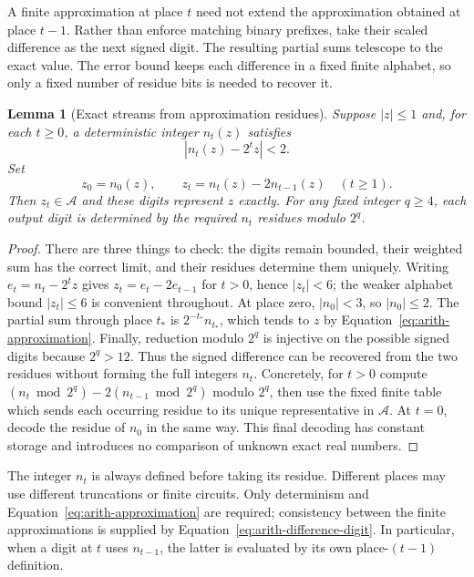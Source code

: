 \documentclass[11pt]{article}
\numberwithin{equation}{section}
\newtheorem{lemma}[theorem]{Lemma}
\theoremstyle{definition}
\theoremstyle{remark}
\begin{document}
A finite approximation at place $t$ need not extend the approximation obtained at place $t-1$. Rather than enforce matching binary prefixes, take their scaled difference as the next signed digit. The resulting partial sums telescope to the exact value. The error bound keeps each difference in a fixed finite alphabet, so only a fixed number of residue bits is needed to recover it.

\begin{lemma}[Exact streams from approximation residues]
\label{lem:arith-residue-stream}
Suppose $|z|\leq1$ and, for each $t\geq0$, a deterministic integer
${n}_t(z)$ satisfies
\begin{equation}
 |{n}_t(z)-2^tz|<2.
 \label{eq:arith-approximation}
\end{equation}
Set
\begin{equation}
 z_0={n}_0(z),\qquad z_t={n}_t(z)-2{n}_{t-1}(z)\quad(t\geq1).
 \label{eq:arith-difference-digit}
\end{equation}
Then $z_t\in\mathcal A$ and these digits represent $z$ exactly.
For any fixed integer $q\geq4$, each output digit is determined by
the required ${n}_t$ residues modulo $2^q$.
\end{lemma}

\begin{proof}
There are three things to check: the digits remain bounded, their weighted sum has the correct limit, and their residues determine them uniquely. Writing $e_t={n}_t-2^tz$ gives
$z_t=e_t-2e_{t-1}$ for $t>0$, hence $|z_t|<6$; the weaker alphabet
bound $|z_t|\leq6$ is convenient throughout.  At place zero,
$|{n}_0|<3$, so $|{n}_0|\leq2$.  The partial sum through place ${t_*}$ is
$2^{-{t_*}}{n}_{t_*}$, which tends to $z$ by Equation~\eqref{eq:arith-approximation}.
Finally, reduction modulo $2^q$ is injective on the possible signed
digits because $2^q>12$.  Thus the signed difference can be recovered
from the two residues without forming the full integers ${n}_t$.
Concretely, for $t>0$ compute
$({n}_t\bmod 2^q)-2({n}_{t-1}\bmod 2^q)$ modulo $2^q$, then use the
fixed finite table which sends each occurring residue to its unique
representative in $\mathcal A$.  At $t=0$, decode the residue of
${n}_0$ in the same way.  This final decoding has constant storage and
introduces no comparison of unknown exact real numbers.
\end{proof}

The integer ${n}_t$ is always defined before taking its residue.
Different places may use different truncations or finite circuits.
Only determinism and Equation~\eqref{eq:arith-approximation} are
required; consistency between the finite approximations is supplied
by Equation~\eqref{eq:arith-difference-digit}.  In particular, when a
digit at $t$ uses ${n}_{t-1}$, the latter is evaluated by its own
place-$(t-1)$ definition.
\end{document}
